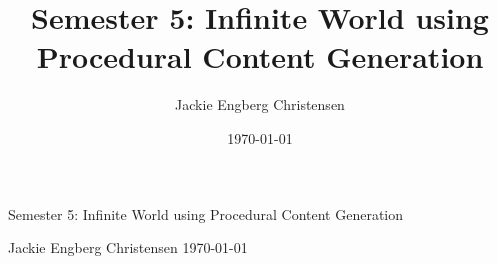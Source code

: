 \documentclass[a4paper,12pt]{report}
\title{Semester 5: Infinite World using Procedural Content Generation}
\author{Jackie Engberg Christensen}
\date{\today}
\begin{document}
\begin{titlepage}
\centering
{\LARGE Semester 5: Infinite World using Procedural Content Generation}
\begin{figure}[H]
\centering
\end{figure}
{\large Jackie Engberg Christensen\linebreak
\today}
\end{titlepage}

\newpage\null\thispagestyle{empty}\newpage



\newpage\null\thispagestyle{empty}\newpage
\tableofcontents












%

\newpage



\end{document}
